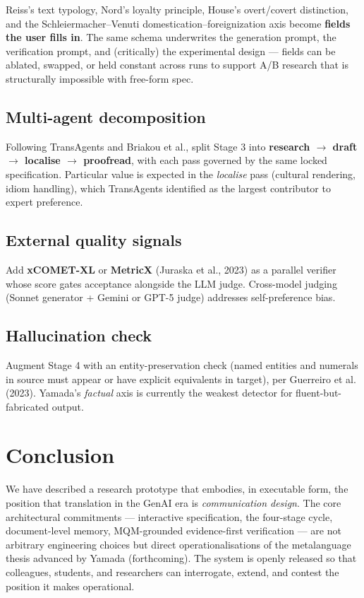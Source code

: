 \documentclass[11pt]{article}
\begin{document}
Reiss's text typology, Nord's loyalty principle, House's overt/covert distinction, and the Schleiermacher--Venuti domestication--foreignization axis become \textbf{fields the user fills in}. The same schema underwrites the generation prompt, the verification prompt, and (critically) the experimental design --- fields can be ablated, swapped, or held constant across runs to support A/B research that is structurally impossible with free-form spec.

\subsection{Multi-agent decomposition}

Following TransAgents and Briakou et al., split Stage 3 into \textbf{research $\rightarrow$ draft $\rightarrow$ localise $\rightarrow$ proofread}, with each pass governed by the same locked specification. Particular value is expected in the \emph{localise} pass (cultural rendering, idiom handling), which TransAgents identified as the largest contributor to expert preference.

\subsection{External quality signals}

Add \textbf{xCOMET-XL} or \textbf{MetricX} (Juraska et al., 2023) as a parallel verifier whose score gates acceptance alongside the LLM judge. Cross-model judging (Sonnet generator + Gemini or GPT-5 judge) addresses self-preference bias.

\subsection{Hallucination check}

Augment Stage 4 with an entity-preservation check (named entities and numerals in source must appear or have explicit equivalents in target), per Guerreiro et al. (2023). Yamada's \emph{factual} axis is currently the weakest detector for fluent-but-fabricated output.

\section{Conclusion}

We have described a research prototype that embodies, in executable form, the position that translation in the GenAI era is \emph{communication design}. The core architectural commitments --- interactive specification, the four-stage cycle, document-level memory, MQM-grounded evidence-first verification --- are not arbitrary engineering choices but direct operationalisations of the metalanguage thesis advanced by Yamada (forthcoming). The system is openly released so that colleagues, students, and researchers can interrogate, extend, and contest the position it makes operational.
\end{document}
